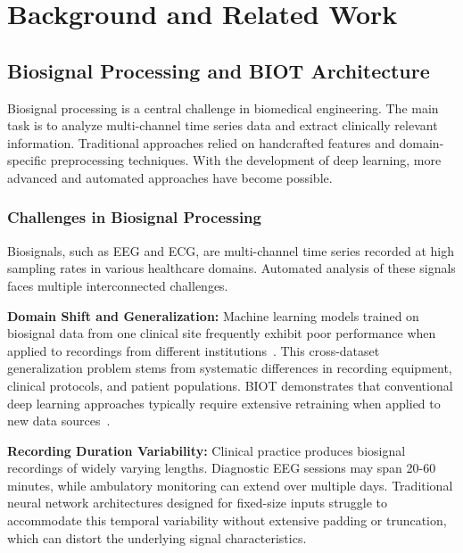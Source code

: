 \cleardoubleoddpage%
\chapter{Background and Related Work}
\label{sec:background}


\section{Biosignal Processing and BIOT Architecture}
\label{sec:background:biot}

Biosignal processing is a central challenge in biomedical engineering. The main task is to analyze multi-channel time series data and extract clinically relevant information. Traditional approaches relied on handcrafted features and domain-specific preprocessing techniques. With the development of deep learning, more advanced and automated approaches have become possible.

\subsection{Challenges in Biosignal Processing}

Biosignals, such as \ac{EEG} and \ac{ECG}, are multi-channel time series recorded at high sampling rates in various healthcare domains. Automated analysis of these signals faces multiple interconnected challenges.

\textbf{Domain Shift and Generalization:} Machine learning models trained on biosignal data from one clinical site frequently exhibit poor performance when applied to recordings from different institutions~\cite{yang2023biot}. This cross-dataset generalization problem stems from systematic differences in recording equipment, clinical protocols, and patient populations. \ac{BIOT} demonstrates that conventional deep learning approaches typically require extensive retraining when applied to new data sources~\cite{yang2023biot}.

\textbf{Recording Duration Variability:} Clinical practice produces biosignal recordings of widely varying lengths. Diagnostic \ac{EEG} sessions may span 20-60 minutes, while ambulatory monitoring can extend over multiple days. Traditional neural network architectures designed for fixed-size inputs struggle to accommodate this temporal variability without extensive padding or truncation, which can distort the underlying signal characteristics.

